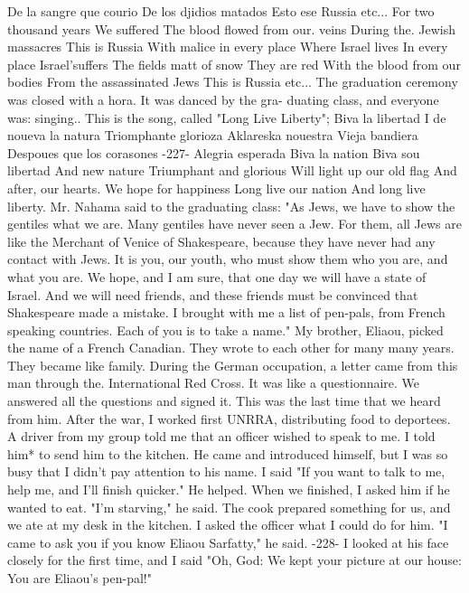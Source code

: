 De la sangre que courio 
De los djidios matados 
Esto ese Russia 
etc... 
For two thousand years 
We suffered 
The blood flowed from our. veins 
During the. Jewish massacres 
This is Russia 
With malice in every place 
Where Israel lives 
In every place 
Israel'suffers 
The fields matt of snow 
They are red 
With the blood from our bodies 
From the assassinated Jews 
This is Russia 
etc... 
The graduation ceremony was closed with a hora. It was danced by the gra-
duating class, and everyone was: singing.. This is the song, called "Long 
Live Liberty"; 
Biva la libertad 
I de noueva la natura 
Triomphante glorioza 
Aklareska nouestra 
Vieja bandiera 
Despoues que los corasones 
-227- 
Alegria esperada 
Biva la nation 
Biva sou libertad 
And new nature 
Triumphant and glorious 
Will light up our old flag 
And after, our hearts. 
We hope for happiness 
Long live our nation 
And long live liberty. 
Mr. Nahama said to the graduating class: "As Jews, we have to show the 
gentiles what we are. Many gentiles have never seen a Jew. For them, 
all Jews are like the Merchant of Venice of Shakespeare, because 
they have never had any contact with Jews. It is you, our youth, who 
must show them who you are, and what you are. We hope, and I am sure, 
that one day we will have a state of Israel. And we will need friends, 
and these friends must be convinced that Shakespeare made a mistake. I 
brought with me a list of pen-pals, from French speaking countries. Each
of you is to take a name." 
My brother, Eliaou, picked the name of a French Canadian. They 
wrote to each other for many many years. They became like family. During the German occupation, a letter came from this man through the. 
International Red Cross. It was like a questionnaire. We answered all the 
questions and signed it. This was the last time that we heard from him. 
After the war, I worked first UNRRA, distributing food to deportees. A 
driver from my group told me that an officer wished to speak to me. I 
told him* to send him to the kitchen. He came and introduced himself, 
but I was so busy that I didn't pay attention to his name. I said "If 
you want to talk to me, help me, and I'll finish quicker." He helped. 
When we finished, I asked him if he wanted to eat. 
"I'm starving," he said. 
The cook prepared something for us, and we ate at my desk in the 
kitchen. I asked the officer what I could do for him. 
"I came to ask you if you know Eliaou Sarfatty," he said. 
-228- 
I looked at his face closely for the first time, and I said "Oh, 
God: We kept your picture at our house: You are Eliaou's pen-pal!" 
